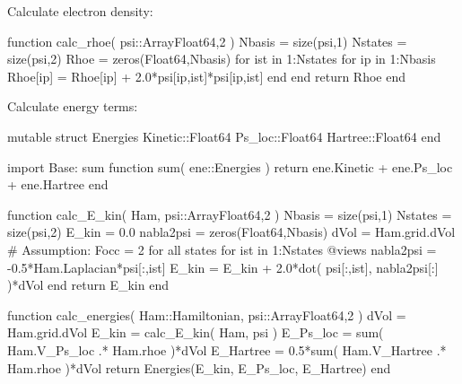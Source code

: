 Calculate electron density:
\begin{juliacode}
function calc_rhoe( psi::Array{Float64,2} )
  Nbasis = size(psi,1)
  Nstates = size(psi,2)
  Rhoe = zeros(Float64,Nbasis)
  for ist in 1:Nstates
    for ip in 1:Nbasis
      Rhoe[ip] = Rhoe[ip] + 2.0*psi[ip,ist]*psi[ip,ist]
    end
  end
  return Rhoe
end
\end{juliacode}

Calculate energy terms:
\begin{juliacode}
mutable struct Energies
  Kinetic::Float64
  Ps_loc::Float64
  Hartree::Float64
end

import Base: sum
function sum( ene::Energies )
  return ene.Kinetic + ene.Ps_loc + ene.Hartree
end

function calc_E_kin( Ham, psi::Array{Float64,2} )
  Nbasis = size(psi,1)
  Nstates = size(psi,2)
  E_kin = 0.0
  nabla2psi = zeros(Float64,Nbasis)
  dVol = Ham.grid.dVol
  # Assumption: Focc = 2 for all states
  for ist in 1:Nstates
    @views nabla2psi = -0.5*Ham.Laplacian*psi[:,ist]
    E_kin = E_kin + 2.0*dot( psi[:,ist], nabla2psi[:] )*dVol
  end
  return E_kin
end

function calc_energies( Ham::Hamiltonian, psi::Array{Float64,2} )
  dVol = Ham.grid.dVol
  E_kin = calc_E_kin( Ham, psi )
  E_Ps_loc = sum( Ham.V_Ps_loc .* Ham.rhoe )*dVol
  E_Hartree = 0.5*sum( Ham.V_Hartree .* Ham.rhoe )*dVol
  return Energies(E_kin, E_Ps_loc, E_Hartree)
end
\end{juliacode}

